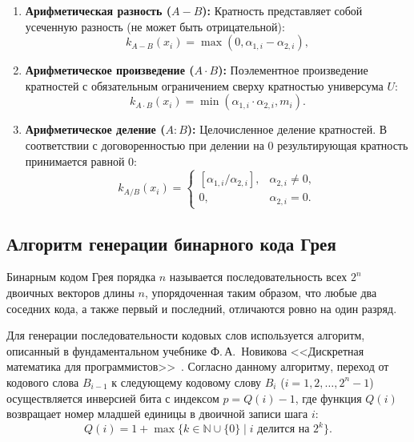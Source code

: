\documentclass[14pt, a4paper]{extarticle}
\begin{document}
\begin{enumerate}
		\item {\bf Арифметическая разность ($A - B$):}
		Кратность представляет собой усеченную разность (не может быть отрицательной):
		\begin{equation}
			k_{A - B}(x_i) = \max(0, \alpha_{1,i} - \alpha_{2,i}),
		\end{equation}
		
		\item {\bf Арифметическое произведение ($A \cdot B$):}
		Поэлементное произведение кратностей с обязательным ограничением сверху кратностью универсума $U$:
		\begin{equation}
			k_{A \cdot B}(x_i) = \min(\alpha_{1,i} \cdot \alpha_{2,i}, m_i).
		\end{equation}
		
		\item {\bf Арифметическое деление ($A : B$):}
		Целочисленное деление кратностей. В соответствии с договоренностью при делении на 0 результирующая кратность принимается равной 0:
		\begin{equation}
			k_{A / B}(x_i) = \begin{cases}
			 \left[ \alpha_{1,i} / \alpha_{2,i} \right], & \alpha_{2,i} \ne 0, \\
				0, & \alpha_{2,i} = 0.
			\end{cases}
		\end{equation}
	\end{enumerate}
	
	\subsection{Алгоритм генерации бинарного кода Грея}
	
	Бинарным кодом Грея порядка $n$ называется последовательность всех $2^n$ двоичных векторов длины $n$, упорядоченная таким образом, что любые два соседних кода, а также первый и последний, отличаются ровно на один разряд.
	
	Для генерации последовательности кодовых слов используется алгоритм, описанный в фундаментальном учебнике Ф.\,А.~Новикова <<Дискретная математика для программистов>>~\cite{novikov}. Согласно данному алгоритму, переход от кодового слова $B_{i-1}$ к следующему кодовому слову $B_i$ ($i = 1, 2, \dots, 2^n - 1$) осуществляется инверсией бита с индексом $p = Q(i) - 1$, где функция $Q(i)$ возвращает номер младшей единицы в двоичной записи шага $i$:
	\begin{equation}
		Q(i) = 1 + \max \{k \in \mathbb{N} \cup \{0\} \mid i \text{ делится на } 2^k\}.
	\end{equation}
	
\end{document}

